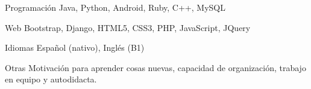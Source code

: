 

\begin{cvskills}

  \cvskill
    {Programación} %
    {Java, Python, Android, Ruby, C++, MySQL} %

  \cvskill
    {Web} %
    {Bootstrap, Django, HTML5, CSS3, PHP, JavaScript, JQuery} %

  \cvskill
    {Idiomas} %
    {Español (nativo), Inglés (B1)} %

  \cvskill
    {Otras} %
    {Motivación para aprender cosas nuevas, capacidad de organización, trabajo en equipo y autodidacta.} %

\end{cvskills}
